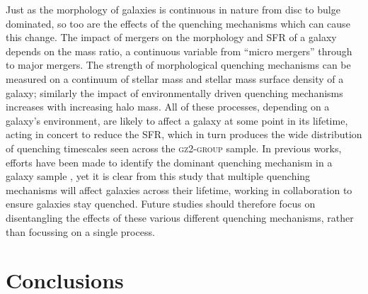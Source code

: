 \documentclass[useAMS,usenatbib]{mn2e}
\begin{document}
Just as the morphology of galaxies is continuous in nature from disc to bulge dominated, so too are the effects of the quenching mechanisms which can cause this change. The impact of mergers on the morphology and SFR of a galaxy depends on the mass ratio, a continuous variable from ``micro mergers'' \citep{beaton14, carlin16} through to major mergers. The strength of morphological quenching mechanisms can be measured on a continuum of stellar mass and stellar mass surface density of a galaxy; similarly the impact of environmentally driven quenching mechanisms increases with increasing halo mass. All of these processes, depending on a galaxy's environment, are likely to affect a galaxy at some point in its lifetime, acting in concert to reduce the SFR, which in turn produces the wide distribution of quenching timescales seen across the \textsc{gz2-group} sample. In previous works, efforts have been made to identify the dominant quenching mechanism in a galaxy sample \citep[e.g.][]{muzzin12, schawinski14, foltz15, woo15, balogh16, darvish16, huertascompany16}, yet it is clear from this study that multiple quenching mechanisms will affect galaxies across their lifetime, working in collaboration to ensure galaxies stay quenched. Future studies should therefore focus on disentangling the effects of these various different quenching mechanisms, rather than focussing on a single process. 

\section{Conclusions}\label{sec:conc}
\end{document}
